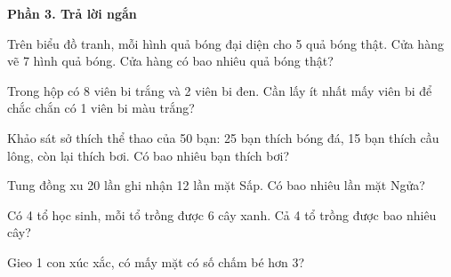 \textbf{Phần 3. Trả lời ngắn}

\begin{ex} %
Trên biểu đồ tranh, mỗi hình quả bóng đại diện cho 5 quả bóng thật. Cửa hàng vẽ 7 hình quả bóng. Cửa hàng có bao nhiêu quả bóng thật?
\end{ex}

\begin{ex} %
Trong hộp có 8 viên bi trắng và 2 viên bi đen. Cần lấy ít nhất mấy viên bi để chắc chắn có 1 viên bi màu trắng?
\end{ex}

\begin{ex} %
Khảo sát sở thích thể thao của 50 bạn: 25 bạn thích bóng đá, 15 bạn thích cầu lông, còn lại thích bơi. Có bao nhiêu bạn thích bơi?
\end{ex}

\begin{ex} %
Tung đồng xu 20 lần ghi nhận 12 lần mặt Sấp. Có bao nhiêu lần mặt Ngửa?
\end{ex}

\begin{ex} %
Có 4 tổ học sinh, mỗi tổ trồng được 6 cây xanh. Cả 4 tổ trồng được bao nhiêu cây?
\end{ex}

\begin{ex} %
Gieo 1 con xúc xắc, có mấy mặt có số chấm bé hơn 3?
\end{ex}
